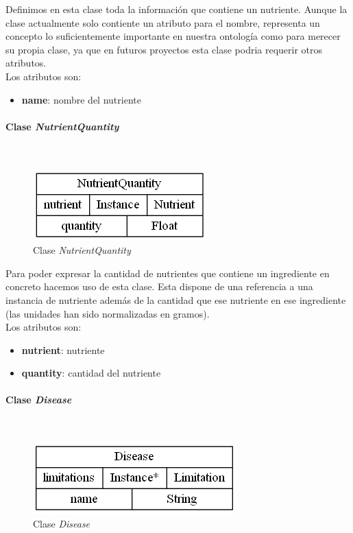 \documentclass[12]{article}
\begin{document}
Definimos en esta clase toda la información que contiene un nutriente.
Aunque la clase actualmente solo contiente un atributo para el nombre, representa un concepto lo suficientemente importante en nuestra ontología como para merecer su propia clase, ya que en futuros proyectos esta clase podria requerir otros atributos.
\\

Los atributos son:
\begin{itemize} 
\item \textbf{name}: nombre del nutriente
\end{itemize}

\vspace{0.5cm}

\paragraph{Clase \emph{NutrientQuantity}}\mbox{}\\
\begin{figure}[H]
\centering
\includegraphics[scale=0.5]{images/class_NutrientQuantity.png}
\caption{Clase \emph{NutrientQuantity}}
\label{fig_class_NutrientQuantity}
\end{figure}

Para poder expresar la cantidad de nutrientes que contiene un ingrediente en concreto hacemos uso de esta clase. Esta dispone de una referencia a una instancia de nutriente además de la cantidad que ese nutriente en ese ingrediente (las unidades han sido normalizadas en gramos). 
\\

Los atributos son: 
\begin{itemize}
\item \textbf{nutrient}: nutriente
\item \textbf{quantity}: cantidad del nutriente
\end{itemize}


\vspace{0.5cm}

\paragraph{Clase \emph{Disease}}\mbox{}\\
\begin{figure}[H]
\centering
\includegraphics[scale=0.5]{images/class_Disease.png}
\caption{Clase \emph{Disease}}
\label{fig_class_Disease}
\end{figure}
\end{document}
